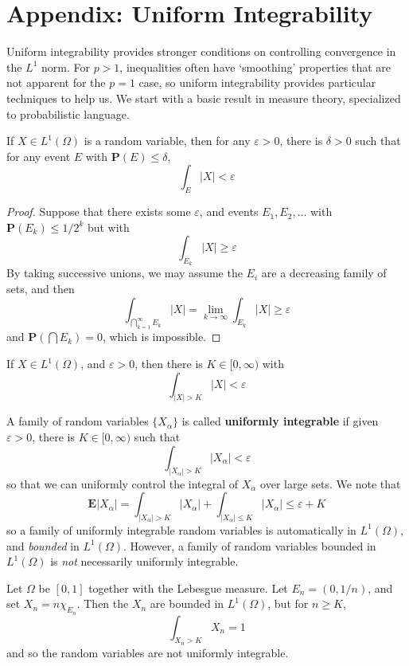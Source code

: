 \chapter{Appendix: Uniform Integrability}

Uniform integrability provides stronger conditions on controlling convergence in the $L^1$ norm. For $p > 1$, inequalities often have `smoothing' properties that are not apparent for the $p = 1$ case, so uniform integrability provides particular techniques to help us. We start with a basic result in measure theory, specialized to probabilistic language.

\begin{lemma}
    If $X \in L^1(\Omega)$ is a random variable, then for any $\varepsilon > 0$, there is $\delta > 0$ such that for any event $E$ with $\mathbf{P}(E) \leq \delta$,
    \[ \int_E |X| < \varepsilon \]
\end{lemma}
\begin{proof}
    Suppose that there exists some $\varepsilon$, and events $E_1, E_2, \dots$ with $\mathbf{P}(E_k) \leq 1/2^k$ but with
    \[ \int_{E_k} |X| \geq \varepsilon \]
    By taking successive unions, we may assume the $E_i$ are a decreasing family of sets, and then
    \[ \int_{\bigcap_{k = 1}^\infty E_k} |X| = \lim_{k \to \infty} \int_{E_k} |X| \geq \varepsilon \]
    and $\mathbf{P}(\bigcap E_k) = 0$, which is impossible.
\end{proof}

\begin{corollary}
    If $X \in L^1(\Omega)$, and $\varepsilon > 0$, then there is $K \in [0,\infty)$ with
    \[ \int_{|X| > K} |X| < \varepsilon \]
\end{corollary}

A family of random variables $\{ X_\alpha \}$ is called {\bf uniformly integrable} if given $\varepsilon > 0$, there is $K \in [0,\infty)$ such that
%
\[ \int_{|X_\alpha| > K} |X_\alpha| < \varepsilon \]
%
so that we can uniformly control the integral of $X_\alpha$ over large sets. We note that
%
\[ \mathbf{E} |X_\alpha| = \int_{|X_\alpha| > K} |X_\alpha| + \int_{|X_\alpha| \leq K} |X_\alpha| \leq \varepsilon + K \]
%
so a family of uniformly integrable random variables is automatically in $L^1(\Omega)$, and {\it bounded} in $L^1(\Omega)$. However, a family of random variables bounded in $L^1(\Omega)$ is {\it not} necessarily uniformly integrable.

\begin{example}
    Let $\Omega$ be $[0,1]$ together with the Lebesgue measure. Let $E_n = (0,1/n)$, and set $X_n = n \chi_{E_n}$. Then the $X_n$ are bounded in $L^1(\Omega)$, but for $n \geq K$,
    \[ \int_{X_n > K} X_n = 1 \]
    and so the random variables are not uniformly integrable.
\end{example}

